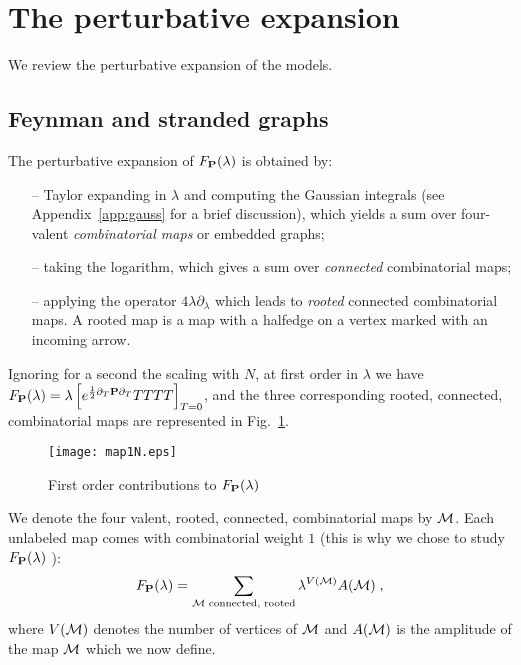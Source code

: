 \documentclass[10pt]{article}
\theoremstyle{plain}
\theoremstyle{definition}
\newcommand{\bP}{ {\bf P} }
\newcommand{\be}{\begin{equation}}
\newcommand{\ee}{\end{equation}}
\begin{document}
\newpage

\section{The perturbative expansion}
\label{sec:expansion}
    
We review the perturbative expansion of the models.
    
\subsection{Feynman and stranded graphs}
\label{sec:graphs-def}

The perturbative expansion of $F_{\bP}(\lambda)$ is obtained by:
\begin{itemize}
 \item[--] Taylor expanding in $\lambda$ and computing the Gaussian integrals (see Appendix~\ref{app:gauss}  for a brief discussion), which yields a sum over four-valent \emph{combinatorial maps} or embedded graphs;
 \item[--] taking the logarithm, which gives a sum over \emph{connected} combinatorial maps;
 \item[--] applying the operator $4\lambda \partial_{\lambda}$ which leads to \emph{rooted} connected combinatorial maps. A rooted map is a map with a halfedge on a vertex marked with an incoming arrow.
\end{itemize}
Ignoring for a second the scaling with $N$, at first order in $\lambda$ we have $F_{\bP}(\lambda) = \lambda \left[ e^{\frac{1}{2}    \partial_T \bP \partial_T     } TTTT  \right]_{T=0}$,
and the three corresponding rooted, connected, combinatorial maps are represented in  Fig.~\ref{fig:map1}.

\begin{figure}[htb]
 \begin{center}
 \texttt{[image: map1N.eps]}  
 \caption{First order contributions to $F_{\bP}(\lambda)$} \label{fig:map1}
 \end{center}
 \end{figure}


We denote the four valent, rooted, connected, combinatorial maps by ${\cal M}$. Each unlabeled map comes with combinatorial weight $1$
(this is why we chose to study $F_{\bP}(\lambda)$ \cite{DiFrancesco:1993nw,RTM,critical,review}):
\be\label{eq:pertexp1}
F_{\bP}(\lambda) = \sum_{ {\cal M} \text{ connected, rooted} } \lambda^{V(\cal M)} A( {\cal M} ) \;,
\ee
where $V(\cal M) $ denotes the number of vertices of ${\cal M}$ and $A( {\cal M} )$ is the amplitude of the map ${\cal M}$ which we now define.
\end{document}
